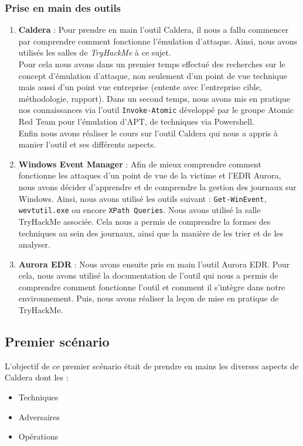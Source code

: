 \documentclass[12pt,letterpaper]{article}
\begin{document}
\subsubsection{Prise en main des outils}
\begin{enumerate}
    \item \textbf{Caldera} : 
    Pour prendre en main l'outil Caldera, il nous a fallu commencer par comprendre comment fonctionne l'émulation d'attaque.
    Ainsi, nous avons utilisés les salles de \textit{TryHackMe} à ce sujet. \\

    Pour cela nous avons dans un premier temps effectué des recherches sur le concept d'émulation d'attaque, non seulement d'un point de vue technique mais aussi d'un point vue entreprise (entente avec l'entreprise cible, méthodologie, rapport).
    Dans un second temps, nous avons mis en pratique nos connaissances via l'outil \verb|Invoke-Atomic| développé par le groupe Atomic Red Team pour l'émulation d'APT, de techniques via Powershell. \\

    Enfin nous avons réaliser le cours sur l'outil Caldera qui nous a appris à manier l'outil et ses différents aspects. 

    \item \textbf{Windows \- Event Manager} :
    Afin de mieux comprendre comment fonctionne les attaques d'un point de vue de la victime et l'EDR Aurora, nous avons décider d'apprendre et de comprendre la gestion des journaux sur Windows.
    Ainsi, nous avons utilisé les outils suivant : \verb|Get-WinEvent|, \verb|wevtutil.exe| ou encore \verb|XPath Queries|.
    Nous avons utilisé la salle TryHackMe associée.
    Cela nous a permis de comprendre la formes des techniques au sein des journaux, ainsi que la manière de les trier et de les analyser. \\
    
    \item \textbf{Aurora EDR} :
    Nous avons ensuite pris en main l'outil Aurora EDR.
    Pour cela, nous avons utilisé la documentation de l'outil qui nous a permis de comprendre comment fonctionne l'outil et comment il s'intègre dans notre environnement.
    Puis, nous avons réaliser la leçon de mise en pratique de TryHackMe. \\
\end{enumerate}

\newpage
\subsection{Premier scénario}
L'objectif de ce premier scénario était de prendre en mains les diverses aspects de Caldera dont les :
\begin{itemize}
    \item Techniques
    \item Adversaires
    \item Opérations
\end{itemize}
\end{document}
